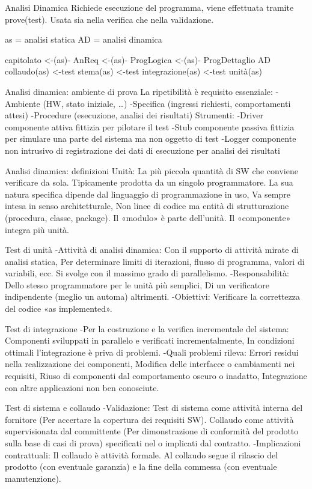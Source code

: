 \documentclass{report}
\begin{document}
Analisi Dinamica
Richiede esecuzione del programma, viene effettuata tramite prove(test). Usata sia nella verifica che nella validazione.

as = analisi statica
AD = analisi dinamica

capitolato <-(as)- AnReq <-(as)- ProgLogica <-(as)- ProgDettaglio 
AD
collaudo(as) <-test stema(as) <-test integrazione(as) <-test unità(as)

Analisi dinamica: ambiente di prova
La ripetibilità è requisito essenziale:
-Ambiente (HW, stato iniziale, …)
-Specifica (ingressi richiesti, comportamenti attesi)
-Procedure (esecuzione, analisi dei risultati)
Strumenti:
-Driver componente attiva fittizia per pilotare il test
-Stub componente passiva fittizia per simulare una parte del sistema ma non oggetto di test
-Logger componente non intrusivo di registrazione dei dati di esecuzione per analisi dei risultati

Analisi dinamica: definizioni
Unità:
La più piccola quantità di SW che conviene verificare da sola.
Tipicamente prodotta da un singolo programmatore.
La sua natura specifica dipende dal linguaggio di programmazione in uso, 
Va sempre intesa in senso architetturale, Non linee di codice ma entità di strutturazione (procedura, classe, package).
Il «modulo» è parte dell’unità. Il «componente» integra più unità.

Test di unità
-Attività di analisi dinamica:
Con il supporto di attività mirate di analisi statica,
Per determinare limiti di iterazioni, flusso di programma, valori di variabili, ecc.
Si svolge con il massimo grado di parallelismo.
-Responsabilità:
Dello stesso programmatore per le unità più semplici,
Di un verificatore indipendente (meglio un automa) altrimenti.
-Obiettivi:
Verificare la correttezza del codice «as implemented».

Test di integrazione
-Per la costruzione e la verifica incrementale del sistema:
Componenti sviluppati in parallelo e verificati incrementalmente,
In condizioni ottimali l’integrazione è priva di problemi.
-Quali problemi rileva:
Errori residui nella realizzazione dei componenti,
Modifica delle interfacce o cambiamenti nei requisiti,
Riuso di componenti dal comportamento oscuro o inadatto,
Integrazione con altre applicazioni non ben conosciute.

Test di sistema e collaudo
-Validazione:
Test di sistema come attività interna del fornitore (Per accertare la copertura dei requisiti SW).
Collaudo come attività supervisionata dal committente (Per dimonstrazione di conformità del prodotto sulla base di casi di prova) specificati nel o implicati dal contratto.
-Implicazioni contrattuali:
Il collaudo è attività formale. Al collaudo segue il rilascio del prodotto (con eventuale garanzia) e la fine della commessa (con eventuale
manutenzione).
\end{document}
